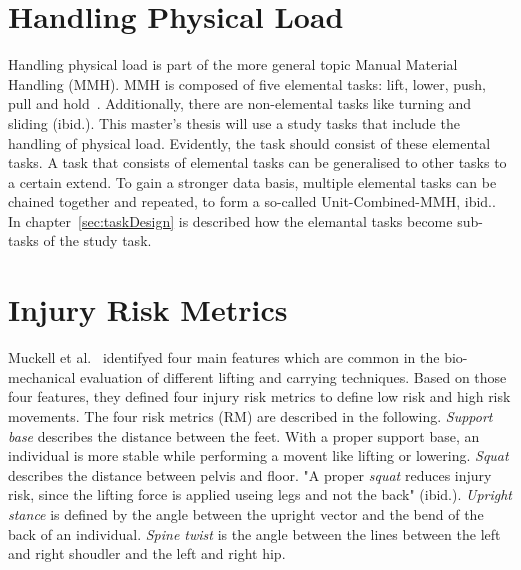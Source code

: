 \section{Handling Physical Load}
\label{section:handlingphysicalload}
Handling physical load is part of the more general topic Manual Material Handling (MMH). MMH is composed of five elemental tasks: lift, lower, push, pull and hold~\cite{mmh}. Additionally, there are non-elemental tasks like turning and sliding (ibid.). This master's thesis will use a study tasks that include the handling of physical load. Evidently, the task should consist of these elemental tasks. A task that consists of elemental tasks can be generalised to other tasks to a certain extend. To gain a stronger data basis, multiple elemental tasks can be chained together and repeated, to form a so-called Unit-Combined-MMH, ibid.. In chapter~\ref{sec:taskDesign} is described how the elemantal tasks become sub-tasks of the study task.

\section{Injury Risk Metrics}
\label{section:rm}
Muckell et al.~\cite{muckell} identifyed four main features which are common in the bio-mechanical evaluation of different lifting and carrying techniques. Based on those four features, they defined four injury risk metrics to define low risk and high risk movements.  The four risk metrics (RM) are described in the following. \textit{Support base} describes the distance between the feet. With a proper support base, an individual is more stable while performing a movent like lifting or lowering. \textit{Squat} describes the distance between pelvis and floor. "A proper \textit{squat} reduces injury risk, since the lifting force is applied useing legs and not the back" (ibid.). \textit{Upright stance} is defined by the angle between the upright vector and the bend of the back of an individual. \textit{Spine twist} is the angle between the lines between the left and right shoudler and the left and right hip.

